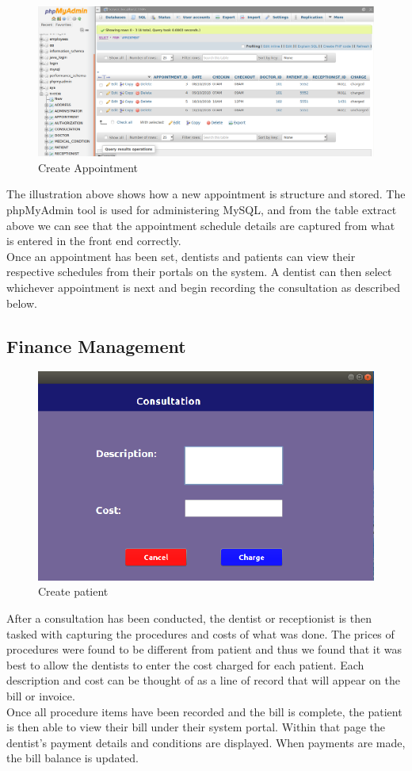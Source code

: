 \documentclass[11 pt]{article}
\begin{document}
\begin{figure}[h]
\centering
\includegraphics[width=\linewidth]{appointment_table_php.png}
\caption{Create Appointment}
\label{fig:Appointment}
\end{figure}
The illustration above shows how a new appointment is structure and stored. The phpMyAdmin tool is used for administering MySQL, and from the table extract above we can see that the appointment schedule details are captured from what is entered in the front end correctly.\\
Once an appointment has been set, dentists and patients can view their respective schedules from their portals on the system. A dentist can then select whichever appointment is next and begin recording the consultation as described below. \\

\subsection{Finance Management}
\begin{figure}[h]
\centering
\includegraphics[width=0.6\linewidth]{consultation.png}
\caption{Create patient}
\label{fig:Add consultation procedure and cost}
\end{figure}
After a consultation has been conducted, the dentist or receptionist is then tasked with capturing the procedures and costs of what was done. The prices of procedures were found to be different from patient and thus we found that it was best to allow the dentists to enter the cost charged for each patient. Each description and cost can be thought of as a line of record that will appear on the bill or invoice.\\
Once all procedure items have been recorded and the bill is complete, the patient is then able to view their bill under their system portal. Within that page the dentist's payment details and conditions are displayed. When payments are made, the bill balance is updated.
\newpage
\end{document}
